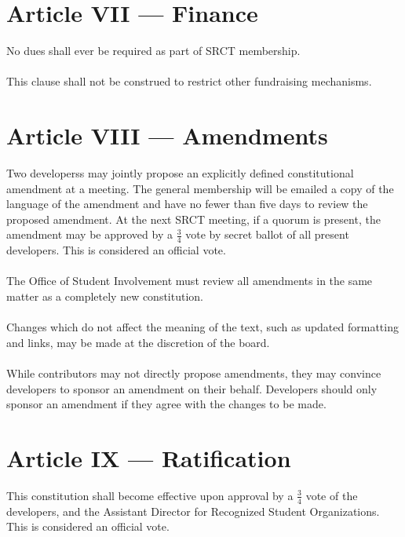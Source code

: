 \documentclass{article}
\begin{document}
  \section{Article VII --- Finance}
  No dues shall ever be required as part of SRCT membership.
  \\ \\
  This clause shall not be construed to restrict other fundraising 
  mechanisms.
  
  \section{Article VIII --- Amendments}
  Two developerss may jointly propose an explicitly defined 
  constitutional amendment at a meeting. The general membership will be 
  emailed a copy of the language of the amendment and have no fewer than
  five days to review the proposed amendment. At the next SRCT meeting, if a
  quorum is present, the amendment may be approved by a $\frac{3}{4}$ 
  vote by secret ballot of all present developers. This is considered an 
  official vote.
  \\ \\
  The Office of Student Involvement must review all amendments in the 
  same matter as a completely new constitution.
  \\ \\
  Changes which do not affect the meaning of the text, such as updated 
  formatting and links, may be made at the discretion of the board.
  \\ \\
  While contributors may not directly propose amendments, they may convince
  developers to sponsor an amendment on their behalf. Developers should only
  sponsor an amendment if they agree with the changes to be made.
  
  \section{Article IX --- Ratification}
  This constitution shall become effective upon approval by a 
  $\frac{3}{4}$ vote of the developers, and the Assistant Director for 
  Recognized Student Organizations. This is considered an official vote.
  
\end{document}
